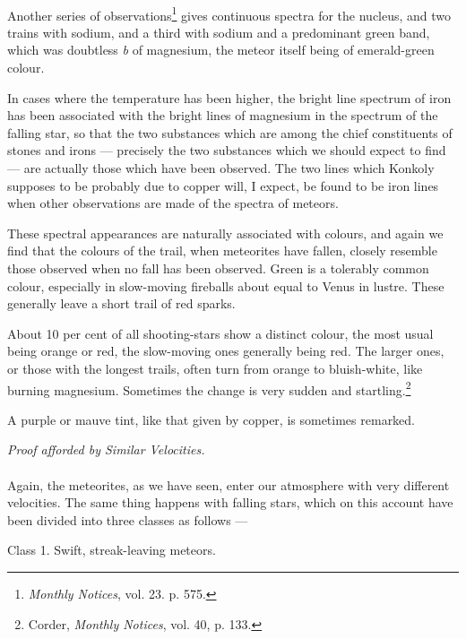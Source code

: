 \documentclass[a4paper, 12pt, oneside, polutonikogreek, english]{article}
\begin{document}
\paragraph{}
Another series of observations\footnote{\emph{Monthly Notices}, vol. 23. p. 575.} gives continuous spectra for the nucleus, and two trains with sodium, and a third with sodium and a predominant green band, which was doubtless \emph{b} of magnesium, the meteor itself being of emerald-green colour.

In cases where the temperature has been higher, the bright line spectrum of iron has been associated with the bright lines of magnesium in the spectrum of the falling star, so that the two substances which are among the chief constituents of stones and irons --- precisely the two substances which we should expect to find --- are actually those which have been observed. The two lines which Konkoly supposes to be probably due to copper will, I expect, be found to be iron lines when other observations are made of the spectra of meteors.

These spectral appearances are naturally associated with colours, and again we find that the colours of the trail, when meteorites have fallen, closely resemble those observed when no fall has been observed. Green is a tolerably common colour, especially in slow-moving fireballs about equal to Venus in lustre. These generally leave a short trail of red sparks.

About 10 per cent of all shooting-stars show a distinct colour, the most usual being orange or red, the slow-moving ones generally being red. The larger ones, or those with the longest trails, often turn from orange to bluish-white, like burning magnesium. Sometimes the change is very sudden and startling.\footnote{Corder, \emph{Monthly Notices}, vol. 40, p. 133.}

A purple or mauve tint, like that given by copper, is sometimes remarked.
\begin{center}
\emph{Proof afforded by Similar Velocities.}
\end{center}
\paragraph{}
Again, the meteorites, as we have seen, enter our atmosphere with very different velocities. The same thing happens with falling stars, which on this account have been divided into three classes as follows ---

Class 1. Swift, streak-leaving meteors.
\end{document}
